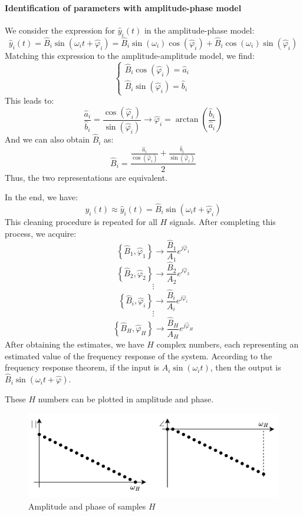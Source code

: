 \paragraph*{Identification of parameters with amplitude-phase model}
We consider the expression for $\hat{y}_i(t)$ in the amplitude-phase model:
\[\hat{y}_i(t)=\hat{B}_i\sin\left(\omega_i t+\hat{\varphi}_i\right)=\hat{B}_i\sin(\omega_i)\cos(\hat{\varphi}_i)+\hat{B}_i\cos(\omega_i)\sin(\hat{\varphi}_i)\]
Matching this expression to the amplitude-amplitude model, we find:
\[\begin{cases} \hat{B}_i\cos(\hat{\varphi}_i)=\hat{a}_i \\ \hat{B}_i\sin(\hat{\varphi}_i)=\hat{b}_i \end{cases}\]
This leads to:
\[\dfrac{\hat{a}_i}{\hat{b}_i}=\dfrac{\cos(\hat{\varphi}_i)}{\sin(\hat{\varphi}_i)}\rightarrow \hat{\varphi}_i=\arctan\left(\dfrac{\hat{b}_i}{\hat{a}_i}\right)\]
And we can also obtain $\hat{B}_i$ as:
\[\hat{B}_i=\dfrac{\frac{\hat{a}_i}{\cos(\hat{\varphi}_i)}+\frac{\hat{b}_i}{\sin(\hat{\varphi}_i)}}{2}\]
Thus, the two representations are equivalent.

In the end, we have:
\[y_i(t)\approx \hat{y}_i(t)=\hat{B}_i\sin(\omega_it+\hat{\varphi}_i)\]
This cleaning procedure is repeated for all $H$ signals.
After completing this process, we acquire:
\[\left\{\hat{B}_1,\hat{\varphi}_1\right\}\rightarrow\dfrac{\hat{B}_1}{A_1}e^{j\hat{\varphi}_1}\]
\[\left\{\hat{B}_2,\hat{\varphi}_2\right\}\rightarrow\dfrac{\hat{B}_2}{A_2}e^{j\hat{\varphi}_2}\]
\[\vdots\]
\[\left\{\hat{B}_i,\hat{\varphi}_i\right\}\rightarrow\dfrac{\hat{B}_i}{A_i}e^{j\hat{\varphi}_i}\]
\[\vdots\]
\[\left\{\hat{B}_H,\hat{\varphi}_H\right\}\rightarrow\dfrac{\hat{B}_H}{A_H}e^{j\hat{\varphi}_H}\]
After obtaining the estimates, we have $H$ complex numbers, each representing an estimated value of the frequency response of the system.
According to the frequency response theorem, if the input is $A_i\sin(\omega_it)$, then the output is $\hat{B}_i\sin\left(\omega_it+\hat{\varphi}\right)$. 

These $H$ numbers can be plotted in amplitude and phase. 
\begin{figure}[H]
    \centering
    \includegraphics[width=0.6\linewidth]{images/amp.png}
    \caption{Amplitude and phase of samples $H$}
\end{figure}

